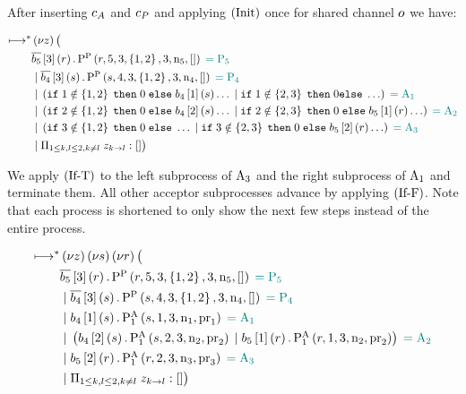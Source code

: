 After inserting $c_A$ and $c_P$ and applying $\left(\operatorname{Init}\right)$ once for shared channel $o$ we have:

\begin{align*}
\longmapsto^*& \left(\nu z\right)\big (\\
&\overline{b_{5}}\left[3\right]\left(r\right).\textstyle\operatorname{P^{P}_{}}\left(r, 5, 3, \left\{1, 2\right\}, 3, \operatorname{n}_5, \mathtt{[]}\right) \;\textcolor{teal}{= \operatorname{P_{5}}}\\
&\; | \; \overline{b_{4}}\left[3\right]\left(s\right).\textstyle\operatorname{P^{P}_{}}\left(s, 4, 3, \left\{1, 2\right\}, 3, \operatorname{n}_4, \mathtt{[]}\right) \;\textcolor{teal}{= \operatorname{P_{4}}}\\
&\; | \; \left(
    \mathtt{if}\; 1 \notin \left\{1, 2\right\}
    \;\mathtt{then}\; 0
    \;\mathtt{else}\; b_{4}\left[1\right]\left(s\right)\ldots
    \; | \;
    \mathtt{if}\; 1 \notin \left\{2, 3\right\}
    \;\mathtt{then}\; 0
    \mathtt{else}\; \ldots
\right) \;\textcolor{teal}{= \operatorname{A_{1}}}\\
&\; | \; \left(
    \mathtt{if}\; 2 \notin \left\{1, 2\right\}
    \;\mathtt{then}\; 0
    \;\mathtt{else}\; b_{4}\left[2\right]\left(s\right)\ldots
    \; | \;
    \mathtt{if}\; 2 \notin \left\{2, 3\right\}
    \;\mathtt{then}\; 0
    \;\mathtt{else}\; b_{5}\left[1\right]\left(r\right)\ldots
\right) \;\textcolor{teal}{= \operatorname{A_{2}}}\\
&\; | \; \left(
    \mathtt{if}\; 3 \notin \left\{1, 2\right\}
    \;\mathtt{then}\; 0
    \;\mathtt{else}\; \ldots
    \; | \;
    \mathtt{if}\; 3 \notin \left\{2, 3\right\}
    \;\mathtt{then}\; 0
    \;\mathtt{else}\; b_{5}\left[2\right]\left(r\right)\ldots
\right) \;\textcolor{teal}{= \operatorname{A_{3}}}\\
&\; | \; \Pi_{1 \le k,l \le 2, k \neq l}\; z_{k\to l}:[]
\big )
\end{align*}

We apply $\left(\operatorname{If-T}\right)$ to the left subprocess of $\operatorname{A_{3}}$ and the right subprocess of $\operatorname{A_{1}}$ and terminate them.
All other acceptor subprocesses advance by applying $\left(\operatorname{If-F}\right)$.
Note that each process is shortened to only show the next few steps instead of the entire process.

\begin{align*}
\longmapsto^*& \left(\nu z\right)\left(\nu s\right)\left(\nu r\right) \big (\\
&\overline{b_{5}}\left[3\right]\left(r\right).\textstyle\operatorname{P^{P}_{}}\left(r, 5, 3, \left\{1, 2\right\}, 3, \operatorname{n}_5, \mathtt{[]}\right) \;\textcolor{teal}{= \operatorname{P_{5}}}\\
&\; | \; \overline{b_{4}}\left[3\right]\left(s\right).\textstyle\operatorname{P^{P}_{}}\left(s, 4, 3, \left\{1, 2\right\}, 3, \operatorname{n}_4, \mathtt{[]}\right) \;\textcolor{teal}{= \operatorname{P_{4}}}\\
&\; | \; b_{4}\left[1\right]\left(s\right) . \textstyle\operatorname{P^{A}_{1}}\left(s, 1, 3, \operatorname{n}_1, \operatorname{pr}_1\right) \;\textcolor{teal}{= \operatorname{A_{1}}}\\
&\; | \; \left(
    b_{4}\left[2\right]\left(s\right) . \textstyle\operatorname{P^{A}_{1}}\left(s, 2, 3, \operatorname{n}_2, \operatorname{pr}_2\right)
    \; | \;
    b_{5}\left[1\right]\left(r\right) . \textstyle\operatorname{P^{A}_{1}}\left(r, 1, 3, \operatorname{n}_2, \operatorname{pr}_2\right)
\right) \;\textcolor{teal}{= \operatorname{A_{2}}}\\
&\; | \; b_{5}\left[2\right]\left(r\right) . \textstyle\operatorname{P^{A}_{1}}\left(r, 2, 3, \operatorname{n}_3, \operatorname{pr}_3\right) \;\textcolor{teal}{= \operatorname{A_{3}}}\\
&\; | \; \Pi_{1 \le k,l \le 2, k \neq l}\; z_{k\to l}:[]
\big )
\end{align*}

